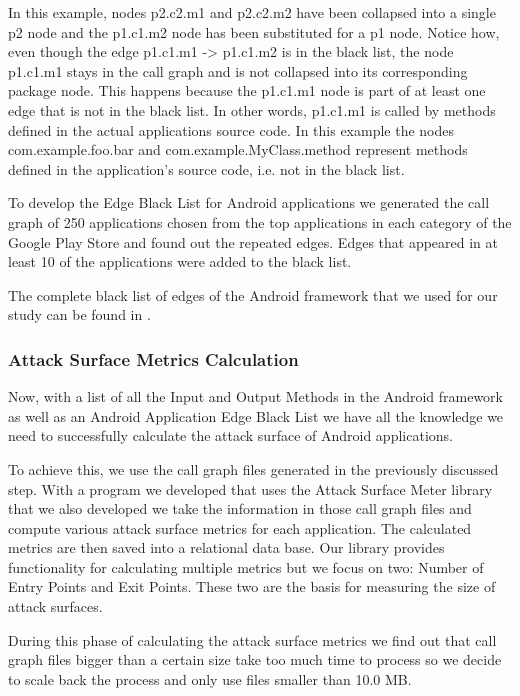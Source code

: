 \documentclass{sig-alternate}
\begin{document}
In this example, nodes p2.c2.m1 and p2.c2.m2 have been collapsed into a single p2 node and the p1.c1.m2 node has been substituted for a p1 node. Notice how, even though the edge p1.c1.m1 -> p1.c1.m2 is in the black list, the node p1.c1.m1 stays in the call graph and is not collapsed into its corresponding package node. This happens because the p1.c1.m1 node is part of at least one edge that is not in the black list. In other words, p1.c1.m1 is called by methods defined in the actual applications source code. In this example the nodes com.example.foo.bar and com.\-example.\-MyClass.\-method represent methods defined in the application's source code, i.e. not in the black list.

To develop the Edge Black List for Android applications we generated the call graph of 250 applications chosen from the top applications in each category of the Google Play Store and found out the repeated edges. Edges that appeared in at least 10 of the applications were added to the black list.

The complete black list of edges of the Android framework that we used for our study can be found in \cite{attack_surface_meter}.

\subsubsection{Attack Surface Metrics Calculation}

Now, with a list of all the Input and Output Methods in the Android framework as well as an Android Application Edge Black List we have all the knowledge we need to successfully calculate the attack surface of Android applications.

To achieve this, we use the call graph files generated in the previously discussed step. With a program we developed that uses the Attack Surface Meter library \cite{attack_surface_meter} that we also developed we take the information in those call graph files and compute various attack surface metrics for each application. The calculated metrics are then saved into a relational data base. Our library provides functionality for calculating multiple metrics but we focus on two: Number of Entry Points and Exit Points. These two are the basis for measuring the size of attack surfaces.

During this phase of calculating the attack surface metrics we find out that call graph files bigger than a certain size take too much time to process so we decide to scale back the process and only use files smaller than 10.0 MB.
\end{document}
